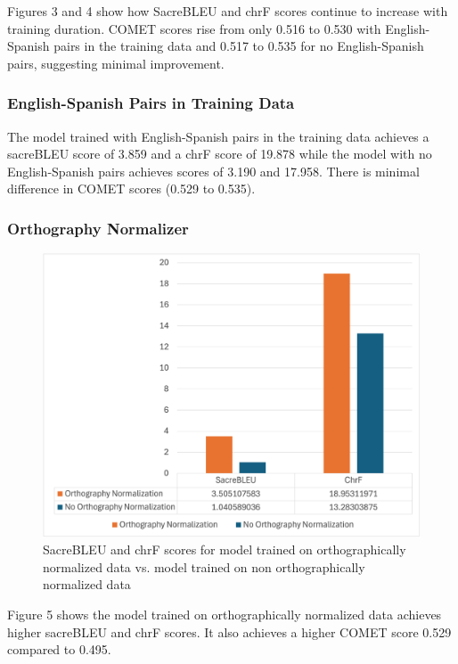 \documentclass[10pt,twocolumn]{article}
\begin{document}
Figures 3 and 4 show how SacreBLEU and chrF scores continue to increase with training duration. COMET scores rise from only 0.516 to 0.530 with English-Spanish pairs in the training data and 0.517 to 0.535 for no English-Spanish pairs, suggesting minimal improvement. 


\subsubsection{English-Spanish Pairs in Training Data}
The model trained with English-Spanish pairs in the training data achieves a sacreBLEU score of 3.859 and a chrF score of 19.878 while the model with no English-Spanish pairs achieves scores of 3.190 and 17.958. There is minimal difference in COMET scores (0.529 to 0.535). 


\subsubsection{Orthography Normalizer}

\begin{figure}
    \centering
    \includegraphics[width=.95\linewidth]{Orthography.png}
    \caption{
        SacreBLEU and chrF scores for model trained on orthographically normalized data vs. model trained on non orthographically normalized data
    }
    \label{fig:first-page}
\end{figure}

Figure 5 shows the model trained on orthographically normalized data achieves higher sacreBLEU and chrF scores. It also achieves a higher COMET score 0.529 compared to 0.495.
\end{document}

